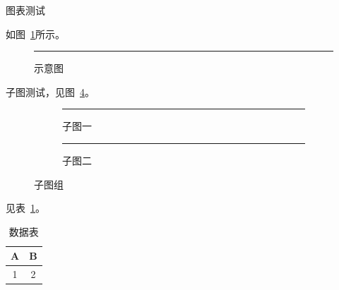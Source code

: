 \documentclass[answer]{cphos-e}
\begin{document}
\maketitlepage

\begin{problem}[20]{图表测试}

\begin{expcontent}

\subq\label{q:fig1} 如图~\ref{fig:demo}所示。

\begin{figure}[htbp]
\centering
\rule{3cm}{2cm}
\caption{示意图}\label{fig:demo}
\end{figure}

\subq 子图测试，见图~\ref{fig:sub}。

\begin{figure}[htbp]
\centering
\begin{subfigure}[b]{0.45\textwidth}
  \centering
  \rule{2cm}{1.5cm}
  \caption{子图一}\label{fig:suba}
\end{subfigure}
\hfill
\begin{subfigure}[b]{0.45\textwidth}
  \centering
  \rule{2cm}{1.5cm}
  \caption{子图二}\label{fig:subb}
\end{subfigure}
\caption{子图组}\label{fig:sub}
\end{figure}


\subq 见表~\ref{tab:data}。

\begin{table}[htbp]
\centering
\caption{数据表}\label{tab:data}
\begin{tabular}{|c|c|}
\hline
A & B \\ \hline
1 & 2 \\ \hline
\end{tabular}
\end{table}
\end{expcontent}

\begin{expanswer}
\anspart[10]

\anspart[10]
\end{expanswer}

\end{problem}
\end{document}
